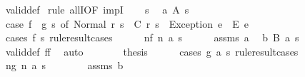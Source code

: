 \begin{isabellebody}
\ valid{\isacharunderscore}{\kern0pt}def\isanewline
{}\isamarkupfalse%
\ {\isacharparenleft}{\kern0pt}rule\ allI{\isacharbrackleft}{\kern0pt}OF\ impI{\isacharbrackright}{\kern0pt}{\isacharparenright}{\kern0pt}\isanewline
\ \ \isamarkupfalse%
\ s\ \isamarkupfalse%
\ a{\isacharcolon}{\kern0pt}\ {\isachardoublequoteopen}A\ s{\isachardoublequoteclose}\isanewline
\ \ \isamarkupfalse%
\ {\isachardoublequoteopen}case\ {\isacharparenleft}{\kern0pt}f\ {\isasymbind}\ g{\isacharparenright}{\kern0pt}\ s\ of\ Normal\ {\isacharparenleft}{\kern0pt}r{\isacharcomma}{\kern0pt}\ s{\isacharprime}{\kern0pt}{\isacharparenright}{\kern0pt}\ {\isasymRightarrow}\ C\ r\ s{\isacharprime}{\kern0pt}\ {\isacharbar}{\kern0pt}\ Exception\ e\ {\isasymRightarrow}\ E\ e{\isachardoublequoteclose}\isanewline
\ \ \isamarkupfalse%
\ {\isacharparenleft}{\kern0pt}cases\ {\isachardoublequoteopen}f\ s{\isachardoublequoteclose}\ rule{\isacharcolon}{\kern0pt}result{\isacharunderscore}{\kern0pt}cases{\isacharparenright}{\kern0pt}\isanewline
\ \ \ \ \isamarkupfalse%
\ nf{\isacharcolon}{\kern0pt}\ {\isacharparenleft}{\kern0pt}n\ a\ s{\isacharprime}{\kern0pt}{\isacharparenright}{\kern0pt}\isanewline
\ \ \ \ \isamarkupfalse%
\ assms{\isacharparenleft}{\kern0pt}{}{\isacharparenright}{\kern0pt}\ a\ \isamarkupfalse%
\ b{\isacharcolon}{\kern0pt}\ {\isachardoublequoteopen}B\ a\ s{\isacharprime}{\kern0pt}{\isachardoublequoteclose}\ \isamarkupfalse%
\ valid{\isacharunderscore}{\kern0pt}def{\isacharbrackleft}{\kern0pt}\ {\isacharquery}{\kern0pt}f{\isacharequal}{\kern0pt}f{\isacharbrackright}{\kern0pt}\ \isamarkupfalse%
\ auto\isanewline
\ \ \ \ \isamarkupfalse%
\ \isamarkupfalse%
\ {\isacharquery}{\kern0pt}thesis\isanewline
\ \ \ \ \isamarkupfalse%
\ {\isacharparenleft}{\kern0pt}cases\ {\isachardoublequoteopen}g\ a\ s{\isacharprime}{\kern0pt}{\isachardoublequoteclose}\ rule{\isacharcolon}{\kern0pt}result{\isacharunderscore}{\kern0pt}cases{\isacharparenright}{\kern0pt}\isanewline
\ \ \ \ \ \ \isamarkupfalse%
\ ng{\isacharcolon}{\kern0pt}\ {\isacharparenleft}{\kern0pt}n\ a{\isacharprime}{\kern0pt}\ s{\isacharprime}{\kern0pt}{\isacharprime}{\kern0pt}{\isacharparenright}{\kern0pt}\isanewline
\ \ \ \ \ \ \isamarkupfalse%
\ assms{\isacharparenleft}{\kern0pt}{}{\isacharparenright}{\kern0pt}\ b\ \isamarkupfalse%

\end{isabellebody}
